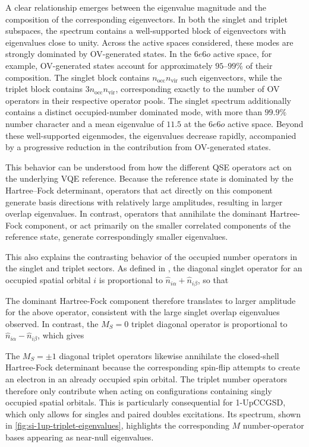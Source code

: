 A clear relationship emerges between the eigenvalue magnitude and the composition of the corresponding eigenvectors. 
In both the singlet and triplet subspaces, the spectrum contains a well-supported block of eigenvectors with eigenvalues close to unity. 
Across the active spaces considered, these modes are strongly dominated by OV-generated states. 
In the $6e6o$ active space, for example, OV-generated states account for approximately $95$--$99\%$ of their composition. 
The singlet block contains $n_{\mathrm{occ}}n_{\mathrm{vir}}$ such eigenvectors, while the triplet block contains $3n_{\mathrm{occ}}n_{\mathrm{vir}}$, corresponding exactly to the number of OV operators in their respective operator pools. 
The singlet spectrum additionally contains a distinct occupied-number dominated mode, with more than $99.9\%$ number character and a mean eigenvalue of $11.5$ at the $6e6o$ active space. 
Beyond these well-supported eigenmodes, the eigenvalues decrease rapidly, accompanied by a progressive reduction in the contribution from OV-generated states.


This behavior can be understood from how the different QSE operators act on the underlying VQE reference. 
Because the reference state is dominated by the Hartree–Fock determinant, operators that act directly on this component generate basis directions with relatively large amplitudes, resulting in larger overlap eigenvalues.
In contrast, operators that annihilate the dominant Hartree-Fock component, or act primarily on the smaller correlated components of the reference state, generate correspondingly smaller eigenvalues.

This also explains the contrasting behavior of the occupied number operators in the singlet and triplet sectors. As defined in , the diagonal singlet operator for an occupied spatial orbital $i$ is proportional to $\hat n_{i\alpha}+\hat n_{i\beta}$, so that
\SingletOnHFEquation

The dominant Hartree-Fock component therefore translates to larger amplitude for the above operator, consistent with the large singlet overlap eigenvalues observed. In contrast, the $M_S=0$ triplet diagonal operator is proportional to $\hat n_{i\alpha}-\hat n_{i\beta}$, which gives
\TripletOnHFEquation

The $M_S=\pm1$ diagonal triplet operators likewise annihilate the closed-shell Hartree-Fock determinant because the corresponding spin-flip attempts to create an electron in an already occupied spin orbital. 
The triplet number operators therefore only contribute when acting on configurations containing singly occupied spatial orbitals. 
This is particularly consequential for 1-UpCCGSD, which only allows for singles and paired doubles excitations. Its spectrum, shown in \cref{fig:si-1up-triplet-eigenvalues}, highlights the corresponding $M$ number-operator bases appearing as near-null eigenvalues.

